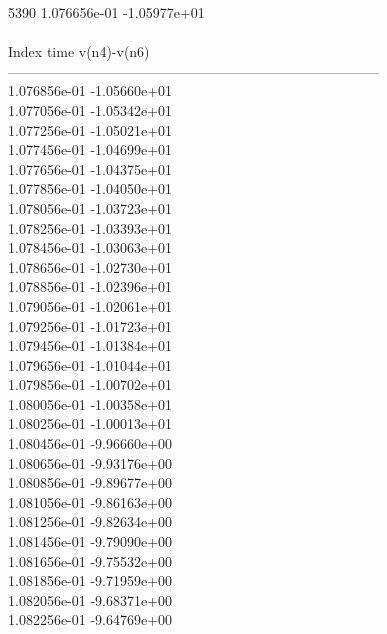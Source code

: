 5390	1.076656e-01	-1.05977e+01	\\ \hline
\\ \hline
Index   time            v(n4)-v(n6)     \\ \hline
--------------------------------------------------------------------------------\\ 	1.076856e-01	-1.05660e+01	\\ 	1.077056e-01	-1.05342e+01	\\ 	1.077256e-01	-1.05021e+01	\\ 	1.077456e-01	-1.04699e+01	\\ 	1.077656e-01	-1.04375e+01	\\ 	1.077856e-01	-1.04050e+01	\\ 	1.078056e-01	-1.03723e+01	\\ 	1.078256e-01	-1.03393e+01	\\ 	1.078456e-01	-1.03063e+01	\\ 	1.078656e-01	-1.02730e+01	\\ 	1.078856e-01	-1.02396e+01	\\ 	1.079056e-01	-1.02061e+01	\\ 	1.079256e-01	-1.01723e+01	\\ 	1.079456e-01	-1.01384e+01	\\ 	1.079656e-01	-1.01044e+01	\\ 	1.079856e-01	-1.00702e+01	\\ 	1.080056e-01	-1.00358e+01	\\ 	1.080256e-01	-1.00013e+01	\\ 	1.080456e-01	-9.96660e+00	\\ 	1.080656e-01	-9.93176e+00	\\ 	1.080856e-01	-9.89677e+00	\\ 	1.081056e-01	-9.86163e+00	\\ 	1.081256e-01	-9.82634e+00	\\ 	1.081456e-01	-9.79090e+00	\\ 	1.081656e-01	-9.75532e+00	\\ 	1.081856e-01	-9.71959e+00	\\ 	1.082056e-01	-9.68371e+00	\\ 	1.082256e-01	-9.64769e+00	\\ \hline
